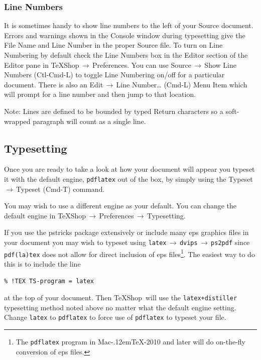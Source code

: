 \documentclass[letterpaper,11pt]{article}
\newcommand{\MacTeX}{Mac\kern-.12em\TeX}
\newcommand{\TS}{\textsf{\TeX Shop}}
\newcommand{\acr}[1]{\textsf{#1}}
\newcommand{\cmd}[1]{\textsf{#1}}
\newcommand{\mnu}[1]{\textsf{#1}}
\newcommand{\To}{\,\(\to\)\,}
\begin{document}
\subsubsection{Line Numbers}

It is sometimes handy to show line numbers to the left of your Source document. Errors and warnings shown in the Console window during typesetting give the File Name and Line Number in the proper Source file. To turn on Line Numbering by default check the \cmd{Line Numbers} box in the \cmd{Editor} section of the \cmd{Editor} pane in \mnu{TeXShop}\To\mnu{Preferences}. You can use \cmd{Source}\To\mnu{Show Line Numbers} (\cmd{Ctl-Cmd-L}) to toggle \cmd{Line Numbering} on/off for a particular document. There is also an \mnu{Edit}\To\mnu{Line Number…} (\cmd{Cmd-L}) Menu Item which will prompt for a line number and then jump to that location.

Note: \textsf{Lines} are defined to be bounded by typed \cmd{Return} characters so a soft-wrapped paragraph will count as a single line.

\subsection{Typesetting}

Once you are ready to take a look at how your document will appear you typeset it with the default engine, \texttt{pdflatex} out of the box, by simply using the \mnu{Typeset}\To\mnu{Typeset} (\cmd{Cmd-T}) command.

You may wish to use a different engine as your default. You can change the default engine in \mnu{TeXShop}\To\mnu{Preferences}\To\mnu{Typesetting}.

If you use the \cmd{pstricks} package extensively or include many \acr{eps} graphics files in your document you may wish to typeset using \texttt{latex}\To\texttt{dvips}\To\texttt{ps2pdf} since \texttt{pdf(la)tex} does not allow for direct inclusion of \acr{eps} files\footnote{The \texttt{pdflatex} program in \MacTeX-2010 and later will do on-the-fly conversion of \acr{eps} files.}. The easiest way to do this is to include the line
\begin{verbatim}
% !TEX TS-program = latex
\end{verbatim}
at the top of your document. Then \TS\ will use the \texttt{latex+distiller} typesetting method noted above no matter what the default engine setting. Change \texttt{latex} to \texttt{pdflatex} to force use of \texttt{pdflatex} to typeset your file.
\end{document}
